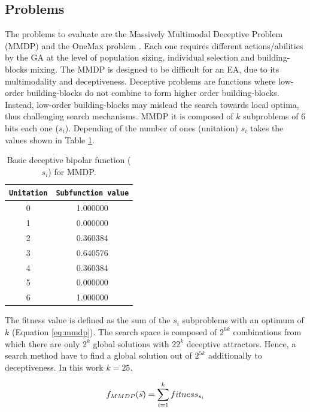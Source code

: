 \documentclass[final,1p,times]{elsarticle}
\begin{document}
\subsection{Problems}
The problems to evaluate are the Massively Multimodal Deceptive Problem (MMDP) \cite{goldberg92massive} and the OneMax problem \cite{ONEMAX}. Each one requires different actions/abilities by the GA at the level of population sizing, individual selection and building-blocks mixing. The MMDP
 is designed to be difficult for an EA, due to
its multimodality and deceptiveness. Deceptive problems are functions where low-order building-blocks do not combine to form higher order building-blocks. Instead, low-order building-blocks may mislead the search towards local optima, thus challenging search mechanisms. MMDP it is composed of $k$ subproblems of 6 bits each one ($s_i$). Depending of
the number of ones (unitation) $s_i$ takes the values shown in Table \ref{table:mmdpvalues}.  

\begin{table}

\centering
{%
\caption{ Basic deceptive bipolar function ($s_i$) for MMDP.}
\label{table:mmdpvalues}
\begin{tabular}{|c|c|}
\hline
\texttt{Unitation}&\texttt{Subfunction value}\\
\hline
0 & 1.000000 \\
\hline
1 & 0.000000 \\
\hline
2 & 0.360384 \\
\hline
3 & 0.640576\\
\hline
4 & 0.360384\\
\hline
5 & 0.000000\\
\hline
6 & 1.000000\\
\hline

\end{tabular}
}


\end{table}



The fitness value is defined as the sum of the $s_i$ subproblems with an optimum of $k$ (Equation \ref{eq:mmdp}).
The search space is composed of $2^{6k}$ combinations from which there
are only $2^k$ global solutions with $22^k$ deceptive
attractors. Hence, a search method have to find a global solution
out of $2^{5k}$ additionally to deceptiveness. In this work $k=25$. 

\begin{equation}\label{eq:mmdp}
\scriptsize
f_{MMDP}(\vec s)= \sum_{i=1}^{k} fitness_{s_i}
\end{equation}
\end{document}
